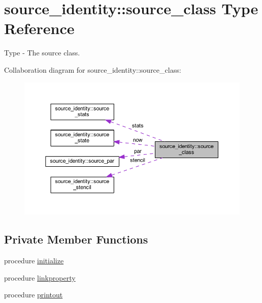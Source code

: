 \hypertarget{structsource__identity_1_1source__class}{}\section{source\+\_\+identity\+:\+:source\+\_\+class Type Reference}
\label{structsource__identity_1_1source__class}


Type -\/ The source class.  




Collaboration diagram for source\+\_\+identity\+:\+:source\+\_\+class\+:\nopagebreak
\begin{figure}[H]
\begin{center}
\leavevmode
\includegraphics[width=350pt]{structsource__identity_1_1source__class__coll__graph}
\end{center}
\end{figure}
\subsection*{Private Member Functions}
\begin{DoxyCompactItemize}
\item 
procedure \mbox{\hyperlink{structsource__identity_1_1source__class_af232e5b647bcb16f34dcc2f797ef7a95}{initialize}}
\item 
procedure \mbox{\hyperlink{structsource__identity_1_1source__class_ad889c3a7ce279e199ecf059a50a73ca2}{linkproperty}}
\item 
procedure \mbox{\hyperlink{structsource__identity_1_1source__class_ac9866a62bf8838665bb929deff5bce24}{printout}}
\end{DoxyCompactItemize}

